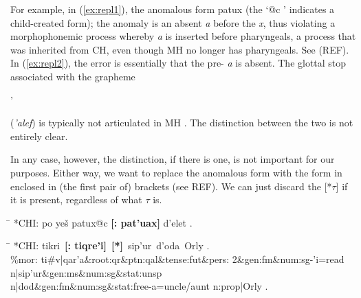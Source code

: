 For example, in (\ref{ex:repl1}), the anomalous 
form \textsf{patux} 
(the `\textsf{@c} ' indicates a child-created form); 
the anomaly is an absent \textit{a} before the \textit{x}, thus violating 
a morphophonemic process 
whereby \textit{a} is inserted before pharyngeals, a process that was inherited 
from CH, even though MH no longer has pharyngeals. See (REF).
In (\ref{ex:repl2}), the error is essentially that the pre-\textit{} 
\textit{a} is absent. The glottal stop
associated with the grapheme \begin{cjhebrew}'\end{cjhebrew} (\textit{'alef}) 
is typically not articulated in MH \citep{montoya:2014}. The distinction
between the two is not entirely clear.

In any case, however, the distinction, if there is one, is not important for our  purposes. 
Either way, we want to replace the anomalous form with the form in enclosed in 
(the first pair of) brackets (see REF). We can just discard the \textsf{[*$\tau$]} if it is present, regardless of what $\tau$ is.

\begin{exe} 
\ex \begin{xlist} 
   \ex\label{ex:repl1} \begin{tabbing}  
	\hspace{0.6in} \= \hspace{5.5in} \kill
	\textsf{*CHI:} \> \textsf{po ye\v{s} patux@c \textbf{[: pat\a'{u}ax]} d\a'{e}let .}
	\end{tabbing}
     \ex\label{ex:repl2} \begin{tabbing}
	\hspace{0.6in} \= \hspace{5.5in} \kill
	\textsf{*CHI:} \> \textsf{tikri \,\textbf{[: tiqre\a'{i}]}\, \textbf{[*]}\, 
	sip\a'{u}r\, d\a'{o}da\, Orly .} \\
	\textsf{\%mor:} \> \textsf{ti\#v|qar\a'{a}\&root:qr\&ptn:qal\&tense:fut\&pers:		2\&gen:fm\&num:sg-\a'{i}=read} \\
                    \> \textsf{n|sip\a'{u}r\&gen:ms\&num:sg\&stat:unsp } \\
                    \> \textsf{n|dod\&gen:fm\&num:sg\&stat:free-a=uncle/aunt} \textsf{n:prop|Orly .}
	\end{tabbing}
   \end{xlist}
\end{exe}

